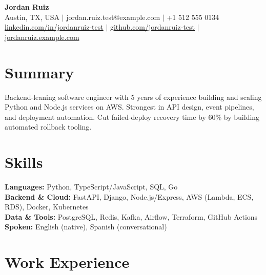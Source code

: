 \documentclass[11pt]{article}
\begin{document}
\begin{center}
{\LARGE\bfseries Jordan Ruiz}\\[3pt]
Austin, TX, USA $\vert$ jordan.ruiz.test@example.com $\vert$ +1 512 555 0134\\[1pt]
\href{https://linkedin.com/in/jordanruiz-test}{linkedin.com/in/jordanruiz-test} $\vert$
\href{https://github.com/jordanruiz-test}{github.com/jordanruiz-test} $\vert$
\href{https://jordanruiz.example.com}{jordanruiz.example.com}
\end{center}

\section{Summary}
Backend-leaning software engineer with 5 years of experience building and
scaling Python and Node.js services on AWS. Strongest in API design, event
pipelines, and deployment automation. Cut failed-deploy recovery time by
60\% by building automated rollback tooling.

\section{Skills}
\textbf{Languages:} Python, TypeScript/JavaScript, SQL, Go\\
\textbf{Backend \& Cloud:} FastAPI, Django, Node.js/Express, AWS (Lambda, ECS, RDS), Docker, Kubernetes\\
\textbf{Data \& Tools:} PostgreSQL, Redis, Kafka, Airflow, Terraform, GitHub Actions\\
\textbf{Spoken:} English (native), Spanish (conversational)

\section{Work Experience}
\end{document}
